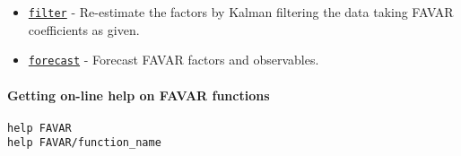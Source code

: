 \begin{itemize}
\itemsep1pt\parskip0pt
\item
  \href{FAVAR/filter}{\texttt{filter}} - Re-estimate the factors by
  Kalman filtering the data taking FAVAR coefficients as given.
\item
  \href{FAVAR/forecast}{\texttt{forecast}} - Forecast FAVAR factors and
  observables.
\end{itemize}

\paragraph{Getting on-line help on FAVAR
functions}\label{getting-on-line-help-on-favar-functions}

\begin{verbatim}
help FAVAR
help FAVAR/function_name
\end{verbatim}



